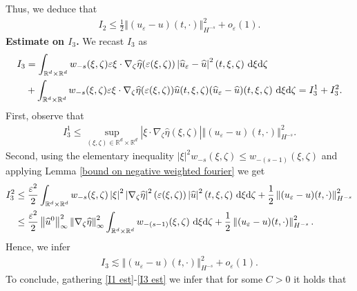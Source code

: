 \documentclass[11pt,reqno]{amsart}
\numberwithin{equation}{section}
\def\dd{{\rm d}}
\begin{document}
Thus, we deduce that 
\begin{align}
I_{2}\leq \frac{1}{2}
\left\Vert (u_{\varepsilon}-u)(t,\cdot)\right\Vert_{H^{-s}}^{2}+o_{\varepsilon}(1). \label{I2 est}   
\end{align}
\textbf{Estimate on $I_{3}$.} We recast $I_{3}$ as   
\begin{align*}
I_{3}&=\int_{\mathbb{R}^{d}\times \mathbb{R}^{d}}w_{-s}(\xi,\zeta)\varepsilon\xi \cdot \nabla_{\zeta}\widehat{\eta}(\varepsilon(\xi,\zeta))\left\vert \widehat{u}_{\varepsilon}-\widehat{u}\right\vert^{2}(t,\xi,\zeta)\ \dd \xi\dd \zeta\\
&+\int_{\mathbb{R}^{d}\times \mathbb{R}^{d}}w_{-s}(\xi,\zeta)\varepsilon \xi\cdot \nabla_{\zeta}\widehat{\eta}(\varepsilon(\xi,\zeta))\widehat{u}(t,\xi,\zeta)(\widehat{u}_{\varepsilon}-\widehat{u})(t,\xi,\zeta)\ \dd \xi\dd \zeta=I_{3}^{1}+I_{3}^{2}.    
\end{align*}
First, observe that 
\begin{align*}
I_{3}^{1}\leq\underset{(\xi,\zeta)\in \mathbb{R}^{d}\times \mathbb{R}^{d}}{\sup}\left\vert \xi \cdot \nabla_{\zeta}\widehat{\eta}(\xi,\zeta)\right\vert \left\Vert (u_{\varepsilon}-u)(t,\cdot)\right\Vert_{H^{-s}}^{2}.       
\end{align*}
Second, using the elementary inequality $\left\vert \xi \right\vert^{2}w_{-s}(\xi,\zeta)\leq w_{-(s-1)}(\xi,\zeta)$ and applying Lemma \ref{bound on negative weighted fourier} we get  
\begin{align*}
I^{2}_{3}&\leq \frac{\varepsilon^{2}}{2}\int_{\mathbb{R}^{d}\times \mathbb{R}^{d}}w_{-s}(\xi,\zeta)\left\vert \xi\right\vert^{2}\left\vert \nabla_{\zeta} \widehat{\eta}\right\vert^{2} (\varepsilon(\xi,\zeta))\left\vert \widehat{u}\right\vert^{2}(t,\xi,\zeta)\ \dd \xi\dd \zeta+\frac{1}{2}\left\Vert ({u}_{\varepsilon}-{u})(t,\cdot)\right\Vert_{H^{-s}}^{2}\\
&\leq \frac{\varepsilon^{2}}{2}\left\Vert \widehat{u}^{0}\right\Vert_{\infty}^{2}\left\Vert \nabla_{\zeta}\widehat{\eta}\right\Vert_{\infty}^{2}\int_{\mathbb{R}^{d}\times \mathbb{R}^{d}}w_{-(s-1)}(\xi,\zeta)\ \dd \xi\dd \zeta+\frac{1}{2}\left\Vert (u_{\varepsilon}-u)(t,\cdot)\right\Vert_{H^{-s}}^{2}.     
\end{align*}
Hence, we infer  
\begin{align}
I_{3}\lesssim \left\Vert (u_{\varepsilon}-u)(t,\cdot)\right\Vert_{H^{-s}}^{2}+o_{\varepsilon}(1).   \label{I3 est}   
\end{align}
To conclude, gathering \eqref{I1 est}-\eqref{I3 est} we infer that for some $C>0$ it holds that 
\end{document}
